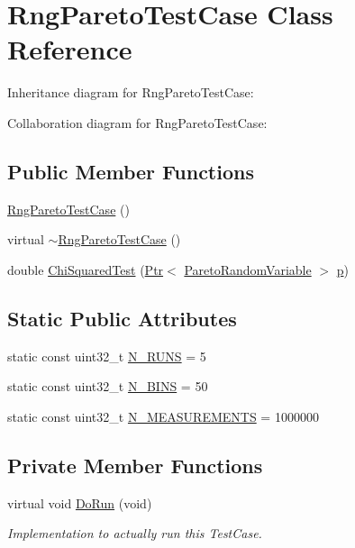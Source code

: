 \hypertarget{classRngParetoTestCase}{}\section{Rng\+Pareto\+Test\+Case Class Reference}
\label{classRngParetoTestCase}


Inheritance diagram for Rng\+Pareto\+Test\+Case\+:


Collaboration diagram for Rng\+Pareto\+Test\+Case\+:
\subsection*{Public Member Functions}
\begin{DoxyCompactItemize}
\item 
\hyperlink{classRngParetoTestCase_adfee53516418cbc68ce3b07b46112827}{Rng\+Pareto\+Test\+Case} ()
\item 
virtual \hyperlink{classRngParetoTestCase_a84dd376218aa38ef0cad0bcc23a96ddc}{$\sim$\+Rng\+Pareto\+Test\+Case} ()
\item 
double \hyperlink{classRngParetoTestCase_a1b1a890069145d6fa0f9626d094ea57d}{Chi\+Squared\+Test} (\hyperlink{classns3_1_1Ptr}{Ptr}$<$ \hyperlink{classns3_1_1ParetoRandomVariable}{Pareto\+Random\+Variable} $>$ \hyperlink{lte__link__budget__x2__handover__measures_8m_ac9de518908a968428863f829398a4e62}{p})
\end{DoxyCompactItemize}
\subsection*{Static Public Attributes}
\begin{DoxyCompactItemize}
\item 
static const uint32\+\_\+t \hyperlink{classRngParetoTestCase_a08aa14adfe517ce6bce686b6a62b9f4b}{N\+\_\+\+R\+U\+NS} = 5
\item 
static const uint32\+\_\+t \hyperlink{classRngParetoTestCase_a1f6889d2d2ecb522f62cdf0ddb8a6153}{N\+\_\+\+B\+I\+NS} = 50
\item 
static const uint32\+\_\+t \hyperlink{classRngParetoTestCase_a61b9950680068b32138272422b85405c}{N\+\_\+\+M\+E\+A\+S\+U\+R\+E\+M\+E\+N\+TS} = 1000000
\end{DoxyCompactItemize}
\subsection*{Private Member Functions}
\begin{DoxyCompactItemize}
\item 
virtual void \hyperlink{classRngParetoTestCase_abb848c4fda89ed45d7a7bcdab8f345de}{Do\+Run} (void)
\begin{DoxyCompactList}\small\item\em Implementation to actually run this Test\+Case. \end{DoxyCompactList}\end{DoxyCompactItemize}
